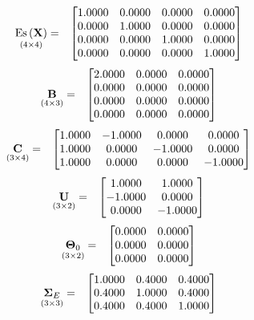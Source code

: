\documentclass{glimmpse-report}
\begin{document}
\begin{eqnarray*}
\underset{\left(4\times4\right)}{\text{Es}\left(\mathbf{X}\right)} & = & \begin{bmatrix}1.0000 & 0.0000 & 0.0000 & 0.0000\protect\\
0.0000 & 1.0000 & 0.0000 & 0.0000\protect\\
0.0000 & 0.0000 & 1.0000 & 0.0000\protect\\
0.0000 & 0.0000 & 0.0000 & 1.0000\protect\\
\end{bmatrix}
\end{eqnarray*}
\begin{eqnarray*}
\underset{\left(4\times3\right)}{\mathbf{B}} & = & \begin{bmatrix}2.0000 & 0.0000 & 0.0000\protect\\
0.0000 & 0.0000 & 0.0000\protect\\
0.0000 & 0.0000 & 0.0000\protect\\
0.0000 & 0.0000 & 0.0000\protect\\
\end{bmatrix}
\end{eqnarray*}
\begin{eqnarray*}
\underset{\left(3\times4\right)}{\mathbf{C}} & = & \begin{bmatrix}1.0000 & -1.0000 & 0.0000 & 0.0000\protect\\
1.0000 & 0.0000 & -1.0000 & 0.0000\protect\\
1.0000 & 0.0000 & 0.0000 & -1.0000\protect\\
\end{bmatrix}
\end{eqnarray*}
\begin{eqnarray*}
\underset{\left(3\times2\right)}{\mathbf{U}} & = & \begin{bmatrix}1.0000 & 1.0000\protect\\
-1.0000 & 0.0000\protect\\
0.0000 & -1.0000\protect\\
\end{bmatrix}
\end{eqnarray*}
\begin{eqnarray*}
\underset{\left(3\times2\right)}{\mathbf{\Theta}_0} & = & \begin{bmatrix}0.0000 & 0.0000\protect\\
0.0000 & 0.0000\protect\\
0.0000 & 0.0000\protect\\
\end{bmatrix}
\end{eqnarray*}
\begin{eqnarray*}
\underset{\left(3\times3\right)}{\mathbf{\Sigma}_E} & = & \begin{bmatrix}1.0000 & 0.4000 & 0.4000\protect\\
0.4000 & 1.0000 & 0.4000\protect\\
0.4000 & 0.4000 & 1.0000\protect\\
\end{bmatrix}
\end{eqnarray*}
\end{document}
